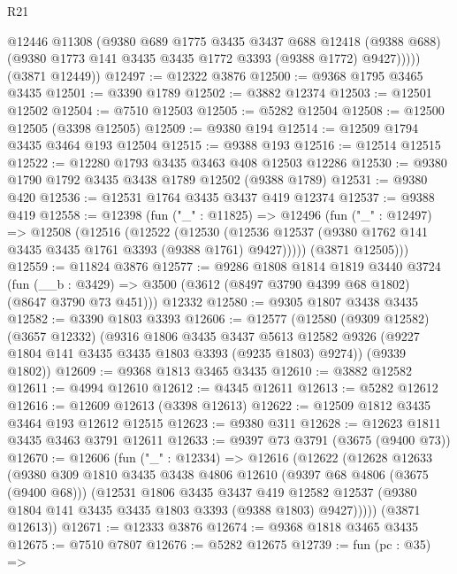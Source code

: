 \begin{lexlean}{R21}
\begin{coremodule}
            @12446
            @11308
            (@9380
              @689
              @1775
              @3435
              @3437
              @688
              @12418
              (@9388 @688)
              (@9380 @1773 @141 @3435 @3435 @1772 @3393 (@9388 @1772) @9427)))))
      (@3871 @12449))
@12497 := @12322 @3876
@12500 := @9368 @1795 @3465 @3435
@12501 := @3390 @1789
@12502 := @3882 @12374
@12503 := @12501 @12502
@12504 := @7510 @12503
@12505 := @5282 @12504
@12508 := @12500 @12505 (@3398 @12505)
@12509 := @9380 @194
@12514 := @12509 @1794 @3435 @3464 @193 @12504
@12515 := @9388 @193
@12516 := @12514 @12515
@12522 := @12280 @1793 @3435 @3463 @408 @12503 @12286
@12530 := @9380 @1790 @1792 @3435 @3438 @1789 @12502 (@9388 @1789)
@12531 := @9380 @420
@12536 := @12531 @1764 @3435 @3437 @419 @12374
@12537 := @9388 @419
@12558 := @12398
    (fun ("_" : @11825) =>
    @12496
      (fun ("_" : @12497) =>
      @12508
        (@12516
          (@12522
            (@12530
              (@12536 @12537 (@9380 @1762 @141 @3435 @3435 @1761 @3393 (@9388 @1761) @9427)))))
        (@3871 @12505)))
@12559 := @11824 @3876
@12577 := @9286
    @1808
    @1814
    @1819
    @3440
    @3724
    (fun (__b : @3429) => @3500 (@3612 (@8497 @3790 @4399 @68 @1802) (@8647 @3790 @73 @451)))
    @12332
@12580 := @9305 @1807 @3438 @3435
@12582 := @3390 @1803 @3393
@12606 := @12577
    (@12580
      (@9309 @12582)
      (@3657 @12332)
      (@9316
        @1806
        @3435
        @3437
        @5613
        @12582
        @9326
        (@9227 @1804 @141 @3435 @3435 @1803 @3393 (@9235 @1803) @9274))
      (@9339 @1802))
@12609 := @9368 @1813 @3465 @3435
@12610 := @3882 @12582
@12611 := @4994 @12610
@12612 := @4345 @12611
@12613 := @5282 @12612
@12616 := @12609 @12613 (@3398 @12613)
@12622 := @12509 @1812 @3435 @3464 @193 @12612 @12515
@12623 := @9380 @311
@12628 := @12623 @1811 @3435 @3463 @3791 @12611
@12633 := @9397 @73 @3791 (@3675 (@9400 @73))
@12670 := @12606
    (fun ("_" : @12334) =>
    @12616
      (@12622
        (@12628
          @12633
          (@9380
            @309
            @1810
            @3435
            @3438
            @4806
            @12610
            (@9397 @68 @4806 (@3675 (@9400 @68)))
            (@12531
              @1806
              @3435
              @3437
              @419
              @12582
              @12537
              (@9380 @1804 @141 @3435 @3435 @1803 @3393 (@9388 @1803) @9427)))))
      (@3871 @12613))
@12671 := @12333 @3876
@12674 := @9368 @1818 @3465 @3435
@12675 := @7510 @7807
@12676 := @5282 @12675
@12739 := fun (pc : @35) =>

\end{coremodule}
\end{lexlean}
